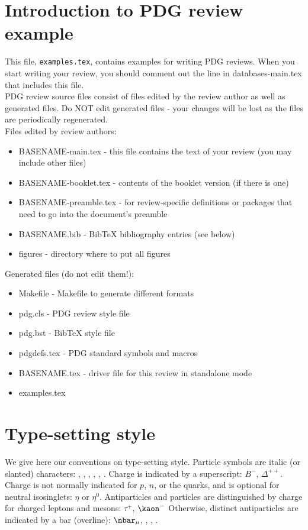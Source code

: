 

\section{Introduction to PDG review example}

This file, {\tt examples.tex}, contains examples for writing PDG
reviews. When you start writing your review, you should
comment out the line in databases-main.tex that includes this file.\\

PDG review source files consist of files edited by the review author as well as generated files. Do NOT edit generated files - your changes will be lost as the files are periodically regenerated.\\
Files edited by review authors:
\begin{itemize}
\item BASENAME-main.tex - this file contains the text of your review (you may include other files)
\item BASENAME-booklet.tex - contents of the booklet version (if there is one)
\item BASENAME-preamble.tex - for review-specific definitions or packages that need to go into the document's preamble
\item BASENAME.bib - BibTeX bibliography entries (see below)
\item figures - directory where to put all figures
\end{itemize}
Generated files (do not edit them!):
\begin{itemize}
\item Makefile - Makefile to generate different formats
\item pdg.cls - PDG review style file
\item pdg.bst - BibTeX style file
\item pdgdefs.tex - PDG standard symbols and macros
\item BASENAME.tex - driver file for this review in standalone mode
\item examples.tex
\end{itemize}


\section{Type-setting style}
We give here our conventions on type-setting style. Particle symbols are italic (or slanted) characters: \en, \pbar, \Lb, \pizero, \Klong, \Dstar. Charge is indicated by a superscript: $B^{-}$, $\Delta^{++}$. Charge is not normally indicated for $p$, $n$, or the quarks, and is optional for neutral isosinglets: $\eta$ or $\eta^{0}$. Antiparticles and particles are distinguished by charge for
charged leptons and mesons: $\tau^{+}$, $\kaon^{-}$ Otherwise, distinct antiparticles are indicated by a bar (overline): $\nbar_{\mu}$, \tbar, \pbar, \Kzerobar.



